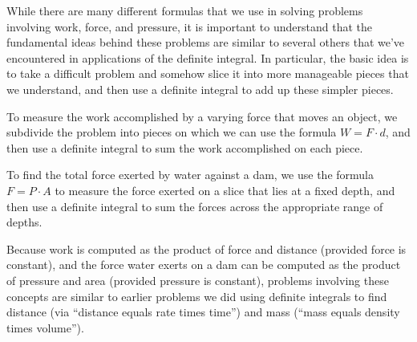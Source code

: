 



While there are many different formulas that we use in solving problems involving work, force, and pressure, it is important to understand that the fundamental ideas behind these problems are similar to several others that we've encountered in applications of the definite integral.  In particular, the basic idea is to take a difficult problem and somehow slice it into more manageable pieces that we understand, and then use a definite integral to add up these simpler pieces.

\begin{summary}
  \item To measure the work accomplished by a varying force that moves an object, we subdivide the problem into pieces on which we can use the formula $W = F \cdot d$, and then use a definite integral to sum the work accomplished on each piece.
  \item To find the total force exerted by water against a dam, we use the formula $F = P \cdot A$ to measure the force exerted on a slice that lies at a fixed depth, and then use a definite integral to sum the forces across the appropriate range of depths.
  \item Because work is computed as the product of force and distance (provided force is constant), and the force water exerts on a dam can be computed as the product of pressure and area (provided pressure is constant), problems involving these concepts are similar to earlier problems we did using definite integrals to find distance (via ``distance equals rate times time'')  and mass (``mass equals density times volume'').
\end{summary}

\clearpage

 

\cleardoublepage